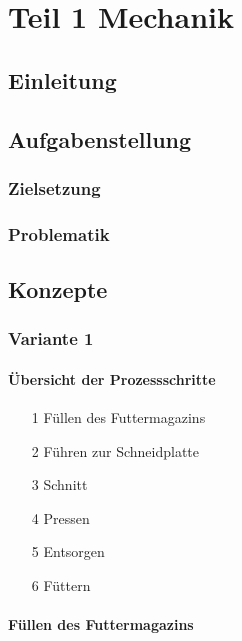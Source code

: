 \chapter{Teil 1 Mechanik}
\section{Einleitung}
\section{Aufgabenstellung}
\subsection{Zielsetzung}
\subsection{Problematik}
\newpage
\section{Konzepte} 

\subsection{Variante 1} 
\subsubsection{Übersicht der Prozessschritte}
\begin{itemize}
\item[1] Füllen des Futtermagazins
\item[2] Führen zur Schneidplatte
\item[3] Schnitt
\item[4] Pressen
\item[5] Entsorgen
\item[6] Füttern
\end{itemize}

\subsubsection{Füllen des Futtermagazins}

